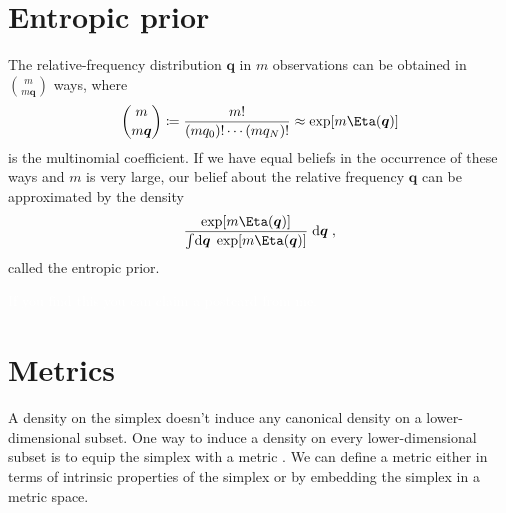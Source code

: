 \documentclass[\ifafour a4paper,12pt,\else a5paper,10pt,\fi%
onecolumn,oneside,article,%
british%
]{memoir}
\makeatletter
\theoremstyle{remark}
\theoremstyle{innote}
\def\sum{\DOTSI\sumop\slimits@}
\newcommand*{\citep}{\parencites}
\newcommand*{\di}{\mathrm{d}}%
\newcommand*{\defd}{\coloneqq}
\newcommand*{\suchthat}{\mid}%
\renewcommand*{\ge}{\geqslant}%
\DeclarePairedDelimiter\set{\{}{\}}
\renewcommand*{\|}[1][]{\nonscript\,#1\vert\nonscript\;\mathopen{}}
\newcommand*{\chap}{ch.}%
\newcommand*{\tsum}{\mathop{\textstyle\sum}\nolimits}
\newcommand*{\yq}{\bm{q}}
\newcommand*{\ysim}{\varDelta}
\newcommand*{\ysum}{\bm{\tsum}}
\newcommand*{\sh}{\Eta}
\newcommand*{\yx}{\bm{x}}
\makeatother
\begin{document}
\section{Entropic prior}
\label{sec:entropic}

The relative-frequency distribution $\yq$ in $m$ observations can be
obtained in $\binom{m}{m\yq}$ ways, where
\begin{equation}
  \label{eq:multin_coeff}
  \binom{m}{m\yq} \defd
  \frac{m!}{(m q_0)! \dotsm (m q_N)!}
  \approx \exp[m \sh(\yq)]
\end{equation}
is the multinomial coefficient. If we have equal beliefs in the occurrence
of these ways and $m$ is very large, our belief about the relative
frequency $\yq$ can be approximated by the density
\begin{equation}
  \label{eq:entropy_prior}
  \frac{\exp[m \sh(\yq)]}{\int\!\di\yq\; \exp[m \sh(\yq)]}\;\di\yq\;,
\end{equation}
called the entropic prior.



\textcolor{white}{If you find this you can claim a postcard from me.}

\section{Metrics}
\label{sec:metrics}

A density on the simplex doesn't induce any canonical density on a
lower-dimensional subset. One way to induce a density on every
lower-dimensional subset is to equip the simplex with a metric
\citep[\chap~V]{choquetbruhatetal1977_r1996}[\chap~4]{bossavit1991}. We can
define a metric either in terms of intrinsic properties of the simplex or by embedding the simplex in a metric space.
\end{document}
